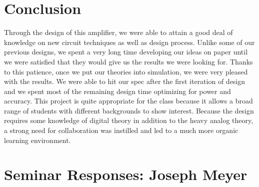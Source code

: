 \documentclass[journal]{IEEEtran}
\begin{document}
\section{Conclusion}
Through the design of this amplifier, we were able to attain a good deal of knowledge on new circuit techniques as well as design process. Unlike some of our previous designs, we spent a very long time developing our ideas on paper until we were satisfied that they would give us the results we were looking for. Thanks to this patience, once we put our theories into simulation, we were very pleased with the results. We were able to hit our spec after the first iteration of design and we spent most of the remaining design time optimizing for power and accuracy.
This project is quite appropriate for the class because it allows a broad range of students with different backgrounds to show interest. Because the design requires some knowledge of digital theory in addition to the heavy analog theory, a strong need for collaboration was instilled and led to a much more organic learning environment. 


%
%
%

%
%
\section{Seminar Responses: Joseph Meyer}
\end{document}
